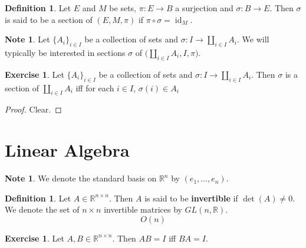 \documentclass{book}
\theoremstyle{definition}
\newtheorem{defn}[definition]{Definition}
\newtheorem{note}[definition]{Note}
\newtheorem{ex}[definition]{Exercise}
\newcommand{\sig}{\sigma}
\newcommand{\R}{\mathbb{R}}
\DeclareMathOperator{\id}{id}
\DeclareMathOperator*{\0}{\mbf{0}}
\DeclareMathOperator*{\1}{\mbf{1}}
\newcommand{\tbf}[1]{\textbf{#1}}
\begin{document}
	\begin{defn}
		Let $E$ and $M$ be sets, $\pi:E \rightarrow B$ a surjection and $\sig: B \rightarrow E$. Then $\sig$ is said to be a section of $(E, M, \pi)$ if $\pi \circ \sig = \id_{M}$. 
	\end{defn}

	\begin{note}
		Let $\{A_i\}_{i \in I}$ be a collection of sets and $\sig: I \rightarrow \coprod\limits_{i \in I} A_i$. We will typically be interested in sections $\sig$ of $\bigg( \coprod\limits_{i \in I} A_i, I, \pi \bigg)$.
	\end{note}

	\begin{ex}
		Let $\{A_i\}_{i \in I}$ be a collection of sets and $\sig: I \rightarrow \coprod\limits_{i \in I} A_i$. Then $\sig$ is a section of $\coprod\limits_{i \in I} A_i$ iff for each $i \in I$, $\sig(i) \in A_i$
	\end{ex}
	
	\begin{proof}
		Clear.
	\end{proof}















	\newpage
	\section{Linear Algebra}
	
	\begin{note}
		We denote the standard basis on $\R^n$ by $(e_1, \ldots, e_n)$.
	\end{note}

	\begin{defn}
		Let $A \in \R^{n \times n}$. Then $A$ is said to be \tbf{invertible} if $\det(A) \neq 0$. We denote the set of $n \times n$ invertible matrices by $GL(n, \R)$.
		$$O(n)$$
	\end{defn}

	\begin{ex}
		Let $A,B \in \R^{n \times n}$. Then $AB = I$ iff $BA = I$.
	\end{ex}
\end{document}
